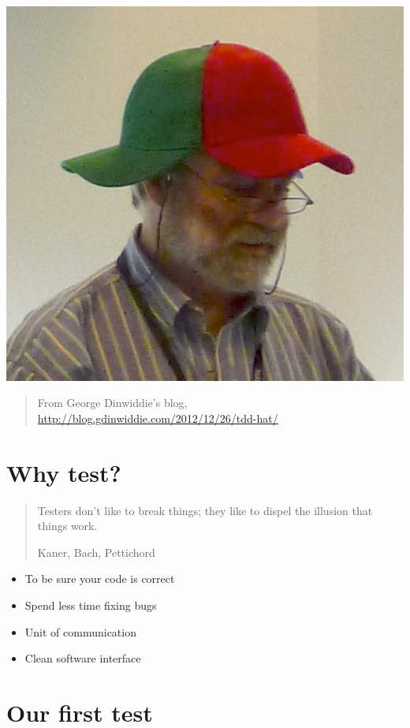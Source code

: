 \documentclass[]{book}
\providecommand{\tightlist}{%
  \setlength{\itemsep}{0pt}\setlength{\parskip}{0pt}}
\begin{document}
\includegraphics{06_george_dinwiddie.jpg}

\begin{quote}
From George Dinwiddie's blog, \url{http://blog.gdinwiddie.com/2012/12/26/tdd-hat/}
\end{quote}

\hypertarget{why-test}{%
\section{Why test?}\label{why-test}}

\begin{quote}
Testers don't like to break things;
they like to dispel the illusion that things work.

Kaner, Bach, Pettichord
\end{quote}

\begin{itemize}
\tightlist
\item
  To be sure your code is correct
\item
  Spend less time fixing bugs
\item
  Unit of communication
\item
  Clean software interface
\end{itemize}

\hypertarget{our-first-test}{%
\section{Our first test}\label{our-first-test}}
\end{document}
